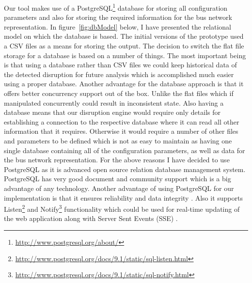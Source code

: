 Our tool makes use of a PostgreSQL\footnote{\url{http://www.postgresql.org/about/}} database for storing all configuration parameters and also for storing the required information for the bus network representation. In figure~\ref{fig:dbModel} below, I have presented the relational model on which the database is based. The initial versions of the prototype used a CSV files as a means for storing the output. The decision to switch the flat file storage for a database is based on a number of things. The most important being is that using a database rather than CSV files we could keep historical data of the detected disruption for future analysis which is accomplished much easier using a proper database. Another advantage for the database approach is that it offers better concurrency support out of the box. Unlike the flat files which if manipulated concurrently could result in inconsistent state. Also having a database means that our disruption engine would require only details for establishing a connection to the respective database where it can read all other information that it requires. Otherwise it would require a number of other files and parameters to be defined which is not as easy to maintain as having one single database containing all of the configuration parameters, as well as data for the bus network representation. For the above reasons I have decided to use PostgreSQL as it is advanced open source relation database management system. PostgreSQL has very good document and community support which is a big advantage of any technology. Another advantage of using PostgreSQL for our implementation is that it ensures reliability and data integrity \cite{lerner2007open}. Also it supports Listen\footnote{\url{http://www.postgresql.org/docs/9.1/static/sql-listen.html}} and Notify\footnote{\url{http://www.postgresql.org/docs/9.1/static/sql-notify.html}} functionality which could be used for real-time updating of the web application along with Server Sent Events (SSE) \cite{serverSentEvents}.

